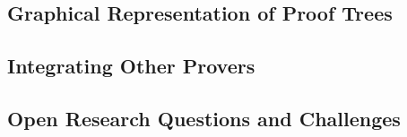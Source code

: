\documentclass{entcs}
\begin{document}
\subsection{Graphical Representation of Proof Trees}

\subsection{Integrating Other Provers}

\subsection{Open Research Questions and Challenges}





% 

\end{document}
